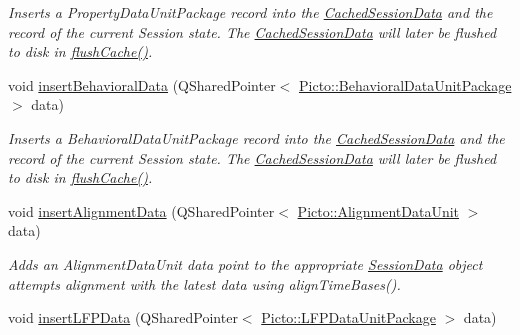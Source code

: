 \begin{DoxyCompactItemize}
\begin{DoxyCompactList}\small\item\em Inserts a Property\-Data\-Unit\-Package record into the \hyperlink{class_cached_session_data}{Cached\-Session\-Data} and the record of the current Session state. The \hyperlink{class_cached_session_data}{Cached\-Session\-Data} will later be flushed to disk in \hyperlink{class_session_info_af4106254bbe6282aae6e79e3b92ece2b}{flush\-Cache()}. \end{DoxyCompactList}\item 
\hypertarget{class_session_info_aa0b15464f57bfed00ab75e211f115f71}{void \hyperlink{class_session_info_aa0b15464f57bfed00ab75e211f115f71}{insert\-Behavioral\-Data} (Q\-Shared\-Pointer$<$ \hyperlink{class_picto_1_1_behavioral_data_unit_package}{Picto\-::\-Behavioral\-Data\-Unit\-Package} $>$ data)}\label{class_session_info_aa0b15464f57bfed00ab75e211f115f71}

\begin{DoxyCompactList}\small\item\em Inserts a Behavioral\-Data\-Unit\-Package record into the \hyperlink{class_cached_session_data}{Cached\-Session\-Data} and the record of the current Session state. The \hyperlink{class_cached_session_data}{Cached\-Session\-Data} will later be flushed to disk in \hyperlink{class_session_info_af4106254bbe6282aae6e79e3b92ece2b}{flush\-Cache()}. \end{DoxyCompactList}\item 
\hypertarget{class_session_info_a5369a72ae100ac6452e324e10361311b}{void \hyperlink{class_session_info_a5369a72ae100ac6452e324e10361311b}{insert\-Alignment\-Data} (Q\-Shared\-Pointer$<$ \hyperlink{class_picto_1_1_alignment_data_unit}{Picto\-::\-Alignment\-Data\-Unit} $>$ data)}\label{class_session_info_a5369a72ae100ac6452e324e10361311b}

\begin{DoxyCompactList}\small\item\em Adds an Alignment\-Data\-Unit data point to the appropriate \hyperlink{class_session_data}{Session\-Data} object attempts alignment with the latest data using align\-Time\-Bases(). \end{DoxyCompactList}\item 
\hypertarget{class_session_info_a7e8f84449a2afcb1723f8c60cae9d81f}{void \hyperlink{class_session_info_a7e8f84449a2afcb1723f8c60cae9d81f}{insert\-L\-F\-P\-Data} (Q\-Shared\-Pointer$<$ \hyperlink{class_picto_1_1_l_f_p_data_unit_package}{Picto\-::\-L\-F\-P\-Data\-Unit\-Package} $>$ data)}\label{class_session_info_a7e8f84449a2afcb1723f8c60cae9d81f}


\end{DoxyCompactItemize}
